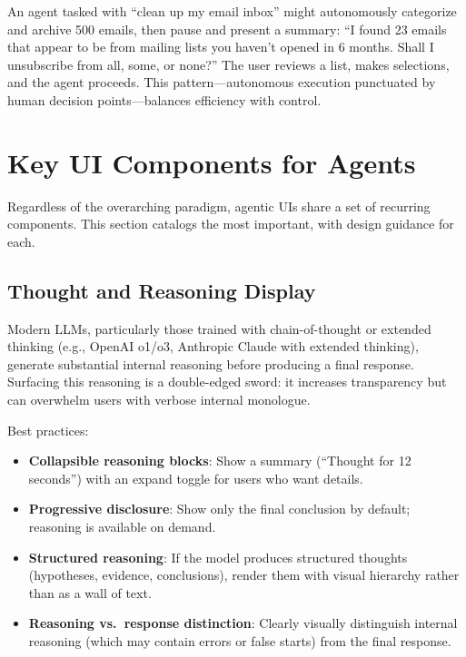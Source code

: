 \begin{examplebox}
An agent tasked with ``clean up my email inbox'' might autonomously categorize and archive 500 emails, then pause and present a summary: ``I found 23 emails that appear to be from mailing lists you haven’t opened in 6 months. Shall I unsubscribe from all, some, or none?'' The user reviews a list, makes selections, and the agent proceeds. This pattern---autonomous execution punctuated by human decision points---balances efficiency with control.
\end{examplebox}

\section{Key UI Components for Agents}
\label{subsec:ui-components}

Regardless of the overarching paradigm, agentic UIs share a set of recurring components. This section catalogs the most important, with design guidance for each.

\subsection{Thought and Reasoning Display}
\label{thought-and-reasoning-display}

Modern LLMs, particularly those trained with chain-of-thought or extended thinking (e.g., OpenAI o1/o3, Anthropic Claude with extended thinking), generate substantial internal reasoning before producing a final response. Surfacing this reasoning is a double-edged sword: it increases transparency but can overwhelm users with verbose internal monologue.

Best practices:

\begin{itemize}
  \item \textbf{Collapsible reasoning blocks}: Show a summary (``Thought for 12 seconds'') with an expand toggle for users who want details.
  \item \textbf{Progressive disclosure}: Show only the final conclusion by default; reasoning is available on demand.
  \item \textbf{Structured reasoning}: If the model produces structured thoughts (hypotheses, evidence, conclusions), render them with visual hierarchy rather than as a wall of text.
  \item \textbf{Reasoning vs.~response distinction}: Clearly visually distinguish internal reasoning (which may contain errors or false starts) from the final response.
\end{itemize}


